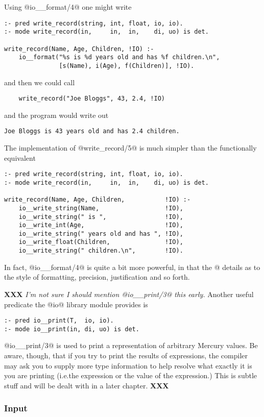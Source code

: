 \documentclass[a4paper,11pt,notitlepage,onecolumn]{article}
\makeatletter
\newcommand{\ie}%
{i.e.\@ }
\newcommand{\XXX}[1]%
{{\small\textbf{XXX} \emph{#1}}}
\makeatother
\begin{document}
Using @io__format/4@ one might write
\begin{verbatim}
:- pred write_record(string, int, float, io, io).
:- mode write_record(in,     in,  in,    di, uo) is det.

write_record(Name, Age, Children, !IO) :-
    io__format("%s is %d years old and has %f children.\n",
               [s(Name), i(Age), f(Children)], !IO).
\end{verbatim}
and then we could call
\begin{verbatim}
    write_record("Joe Bloggs", 43, 2.4, !IO)
\end{verbatim}
and the program would write out
\begin{verbatim}
Joe Bloggs is 43 years old and has 2.4 children.
\end{verbatim}
The implementation of @write_record/5@ is much simpler than the
functionally equivalent
\begin{verbatim}
:- pred write_record(string, int, float, io, io).
:- mode write_record(in,     in,  in,    di, uo) is det.

write_record(Name, Age, Children,           !IO) :-
    io__write_string(Name,                  !IO),
    io__write_string(" is ",                !IO),
    io__write_int(Age,                      !IO),
    io__write_string(" years old and has ", !IO),
    io__write_float(Children,               !IO),
    io__write_string(" children.\n",        !IO).
\end{verbatim}

In fact, @io__format/4@ is quite a bit more powerful, in
that the @%
details as to the style of formatting, precision,
justification and so forth.

\XXX{I'm not sure I should mention @io\_\_print/3@ this early.}
Another useful predicate the @io@ library module provides is
\begin{verbatim}
:- pred io__print(T,  io, io).
:- mode io__print(in, di, uo) is det.
\end{verbatim}
@io__print/3@ is used to print a representation of arbitrary
Mercury values.  Be aware, though, that if you try to
print the results of expressions, the compiler may ask you
to supply more type information to help resolve what
exactly it is you are printing (\ie the expression or the
value of the expression.)  This is subtle stuff and will
be dealt with in a later chapter. \XXX{}

\subsubsection{Input}
\end{document}

